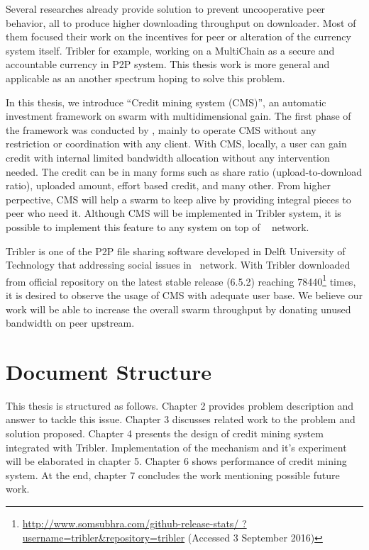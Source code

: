 Several researches already provide solution to prevent uncooperative peer behavior, all to produce higher downloading throughput on downloader. Most of them focused their work on the incentives for peer or alteration of the currency system itself. Tribler for example, working on a MultiChain \cite{2015:multichain:norberhuis} as a secure and accountable currency in P2P system.  This thesis work is more general and applicable as an another spectrum hoping to solve this problem. 

In this thesis, we introduce ``Credit mining system (CMS)'', an automatic investment framework on swarm with multidimensional gain. The first phase of the framework was conducted by \citeauthor{2015:creditmining:capota}, mainly to operate CMS without any restriction or coordination with any client. With CMS, locally, a user can gain credit with internal limited bandwidth allocation without any intervention needed. The credit can be in many forms such as share ratio (upload-to-download ratio), uploaded amount, effort based credit, and many other. From higher perpective, CMS will help a swarm to keep alive by providing integral pieces to peer who need it. Although CMS will be implemented in Tribler system, it is possible to implement this feature to any system on top of \bt~ network.

Tribler is one of the P2P file sharing software developed in Delft University of Technology that addressing social issues in \bt~network\cite{2008:tribler:pouwelse}. With Tribler downloaded from official repository on the latest stable release (6.5.2) reaching  78440\footnote{\url{http://www.somsubhra.com/github-release-stats/ ?username=tribler&repository=tribler} (Accessed 3 September 2016)} times, it is desired to observe the usage of CMS with adequate user base. We believe our work will be able to increase the overall swarm throughput by donating unused bandwidth on peer upstream.



\section{Document Structure}
This thesis is structured as follows. Chapter 2 provides problem description and answer to tackle this issue. Chapter 3 discusses related work to the problem and solution proposed. Chapter 4 presents the design of credit mining system integrated with Tribler. Implementation of the mechanism and it's experiment will be elaborated in chapter 5. Chapter 6 shows performance of credit mining system. At the end, chapter 7 concludes the work mentioning possible future work.
